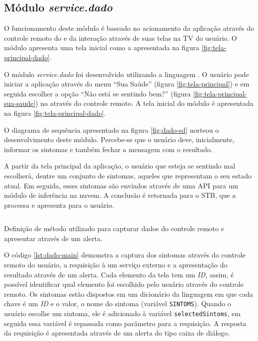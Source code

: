 \subsection{Módulo \textit{service.dado}}\label{subsubsec:dado}

O funcionamento deste módulo é baseado no acionamento da aplicação através
do controle remoto do \stb[] e da interação através de suas telas na TV
do usuário. O módulo apresenta uma tela inicial como a apresentada na 
figura \vref{fig:tela-principal-dado}.

O módulo \textit{service.dado} foi desenvolvido utilizando a linguagem
\python[]. O usuário pode iniciar a aplicação através do menu ``Sua Saúde''
(figura \vref{fig:tela-principal}) e em seguida escolher a opção ``Não está se
sentindo bem?'' (figura \vref{fig:tela-principal-sua-saude}) no \stb[] através
do controle remoto. A tela inicial do módulo é  apresentada na figura
\vref{fig:tela-principal-dado}.

O diagrama de sequência apresentado na figura \ref{fig:dado-sd} norteou
o desenvolvimento deste módulo. Percebe-se que o usuário deve, inicialmente,
informar os sintomas e também fechar a mensagem com o resultado.


A partir da tela principal da aplicação, o usuário que esteja se sentindo mal escolherá,
dentre um conjunto de sintomas, aqueles que representam o seu estado atual. Em
seguida, esses sintomas são enviados através de uma API para um
módulo de inferência na nuvem. A conclusão é retornada para o STB, que a processa e 
apresenta para o usuário.

\begin{listing}[ht!]
\inputminted{python}{codigos/dado-main.py}
\caption{Definição de método utilizado para capturar dados do controle remoto
e apresentar através de um alerta.}
\label{lst:dado-main}
\end{listing}

O código \ref{lst:dado-main} demonstra a captura dos sintomas através do
controle remoto do usuário, a requisição à um serviço externo e a apresentação
do resultado através de um alerta. Cada elemento da tela tem um \textit{ID},
assim, é possível identificar qual elemento foi escolhido pelo usuário através
do controle remoto.  Os sintomas estão dispostos em um dicionário da linguagem
\python[] em que cada chave é um \textit{ID} e o valor, o nome do sintoma
(variável \texttt{SINTOMS}). Quando o usuário escolhe um sintoma, ele 
é adicionado à variável \texttt{selectedSintoms}, em seguida essa variável é
repassada como parâmetro para a requisição. A resposta da requisição é apresentada
através de um alerta do tipo caixa de diálogo.

